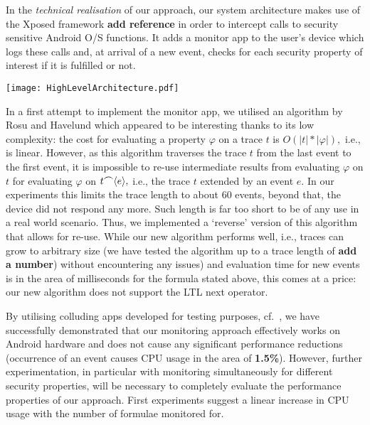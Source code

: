 \documentclass[runningheads]{llncs}
\begin{document}
In the \emph{technical realisation} of our approach, our system
architecture makes use of the Xposed framework \cite{rovo89} {\bf add
  reference} in order to intercept calls to security sensitive Android
O/S functions. It adds a monitor app to the user's device which logs
these calls and, at arrival of a new event, checks for each security
property of interest if it is fulfilled or not.

\begin{center}
\texttt{[image: HighLevelArchitecture.pdf]}
\end{center}

In a first attempt to implement the monitor app, we utilised an
algorithm by Rosu and Havelund \cite{RosuHavelund} which appeared to
be interesting thanks to its low complexity: the cost for evaluating a
property $\varphi$ on a trace $t$ is $O(|t| * |\varphi|),$ i.e., is
linear. However, as this algorithm traverses the trace $t$ from the
last event to the first event, it is impossible to re-use intermediate
results from evaluating $\varphi$ on $t$ for evaluating $\varphi$ on
$t {\mathbin{\raise 0.8ex\hbox{$\frown$}}} \langle e \rangle,$ i.e.,
the trace $t$ extended by an event $e.$ In our experiments this limits
the trace length to about 60 events, beyond that, the device did not
respond any more. Such length is far too short to be of any use in a
real world scenario. Thus, we implemented a `reverse' version of this
algorithm that allows for re-use. While our new algorithm performs
well, i.e., traces can grow to arbitrary size (we have tested the
algorithm up to a trace length of {\bf add a number}) without
encountering any issues) and evaluation time for new events is in the
area of milliseconds for the formula stated above, this comes at a
price: our new algorithm does not support the LTL next operator.

By utilising colluding apps developed for testing purposes,
cf.\ \cite{collusion17}, we have successfully demonstrated that our
monitoring approach effectively works on Android hardware and does not
cause any significant performance reductions (occurrence of an event
causes CPU usage in the area of {\bf 1.5\%}). However, further
experimentation, in particular with monitoring simultaneously for
different security properties, will be necessary to completely
evaluate the performance properties of our approach. First experiments
suggest a linear increase in CPU usage with the number of formulae
monitored for.




\end{document}
